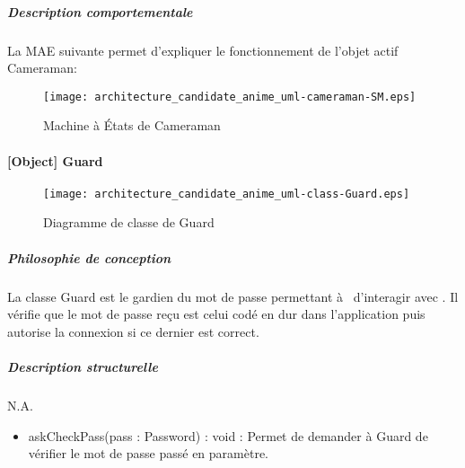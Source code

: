 \newpage
        \subparagraph{Description comportementale}%
            La MAE suivante permet d'expliquer le fonctionnement de l'objet actif Cameraman:
            \begin{figure} [H]
                \centering
                \texttt{[image: architecture\_candidate\_anime\_uml-cameraman-SM.eps]}
                \caption{Machine à États de Cameraman}
                \label{MAE-Cameraman}
            \end{figure}

\newpage

    \paragraph{[Object] Guard}%
        \begin{figure} [H]
            \centering
            \texttt{[image: architecture\_candidate\_anime\_uml-class-Guard.eps]}
            \caption{Diagramme de classe de Guard}
            \label{Classe-Guard}
        \end{figure}
        \subparagraph{Philosophie de conception}%
        La classe Guard est le gardien du mot de passe permettant à \appliA~d'interagir avec \appliLin.
        Il vérifie que le mot de passe reçu est celui codé en dur dans l'application puis autorise la connexion si ce dernier est correct.
        \subparagraph{Description structurelle}%
            N.A.
            \begin{itemize}
                \item{askCheckPass(pass : Password) : void : Permet de demander à Guard de vérifier le mot de passe passé en paramètre.}
            \end{itemize}

\newpage

